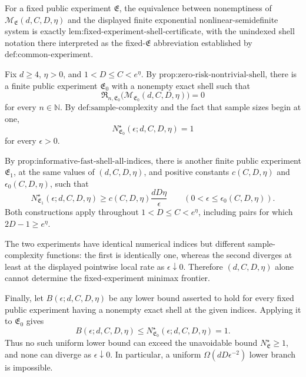 For a fixed public experiment \(\mathfrak E\), the equivalence between nonemptiness of \(\mathcal M_{\mathfrak E}(d,C,D,\eta)\) and the displayed finite exponential nonlinear-semidefinite system is exactly \(\text{lem:fixed-experiment-shell-certificate}\), with the unindexed shell notation there interpreted as the fixed-\(\mathfrak E\) abbreviation established by \(\text{def:common-experiment}\).

Fix \(d\ge4\), \(\eta>0\), and \(1<D\le C<e^\eta\). By \(\text{prop:zero-risk-nontrivial-shell}\), there is a finite public experiment \(\mathfrak E_0\) with a nonempty exact shell such that
\[
\mathfrak R_{n,\mathfrak E_0}\bigl(\mathcal M_{\mathfrak E_0}(d,C,D,\eta)\bigr)=0
\]
for every \(n\in\mathbb N\). By \(\text{def:sample-complexity}\) and the fact that sample sizes begin at one,
\[
N^\star_{\mathfrak E_0}(\epsilon;d,C,D,\eta)=1
\]
for every \(\epsilon>0\).

By \(\text{prop:informative-fast-shell-all-indices}\), there is another finite public experiment \(\mathfrak E_1\), at the same values of \((d,C,D,\eta)\), and positive constants \(c(C,D,\eta)\) and \(\epsilon_0(C,D,\eta)\), such that
\[
N^\star_{\mathfrak E_1}(\epsilon;d,C,D,\eta)
\ge c(C,D,\eta)\frac{dD\eta}{\epsilon}
\qquad(0<\epsilon\le\epsilon_0(C,D,\eta)).
\]
Both constructions apply throughout \(1<D\le C<e^\eta\), including pairs for which \(2D-1\ge e^\eta\).

The two experiments have identical numerical indices but different sample-complexity functions: the first is identically one, whereas the second diverges at least at the displayed pointwise local rate as \(\epsilon\downarrow0\). Therefore \((d,C,D,\eta)\) alone cannot determine the fixed-experiment minimax frontier.

Finally, let \(B(\epsilon;d,C,D,\eta)\) be any lower bound asserted to hold for every fixed public experiment having a nonempty exact shell at the given indices. Applying it to \(\mathfrak E_0\) gives
\[
B(\epsilon;d,C,D,\eta)
\le N^\star_{\mathfrak E_0}(\epsilon;d,C,D,\eta)=1.
\]
Thus no such uniform lower bound can exceed the unavoidable bound \(N^\star_{\mathfrak E}\ge1\), and none can diverge as \(\epsilon\downarrow0\). In particular, a uniform \(\Omega(dD\epsilon^{-2})\) lower branch is impossible.